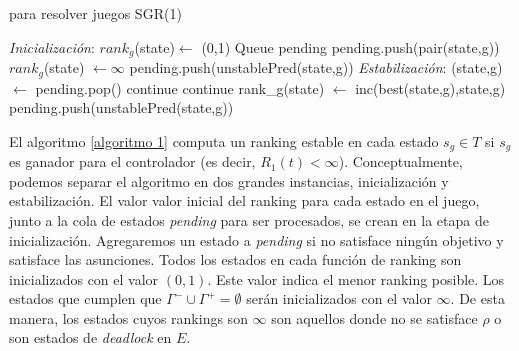 \begin{algorithm}
\caption{para resolver juegos SGR(1)}\label{euclid}
\label{algoritmo 1}
\begin{algorithmic}[1]
\BState \emph{Inicialización}:
        \State $rank_g$(state)$\gets$ (0,1)
    \EndFor
\EndFor
\State Queue pending
        \State pending.push(pair(state,g))
    \EndIf
            \State $rank_g$(state) $\gets \infty$
            \State pending.push(unstablePred(state,g))
        \EndFor
    \EndIf
\EndFor
\BState \emph{Estabilización}:
    \State (state,g) $\gets$ pending.pop()
        \State continue
    \EndIf
        \State continue
    \EndIf
    \State rank_g(state) $\gets$ inc(best(state,g),state,g)
    \State pending.push(unstablePred(state,g))
\EndWhile
\end{algorithmic}
\end{algorithm}


El algoritmo \ref{algoritmo 1} computa un ranking estable en cada estado $s_g \in T$ si $s_g$ es ganador para el
controlador (es decir, $R_1(t)<\infty$). Conceptualmente, podemos separar el algoritmo en dos grandes instancias,
inicialización y estabilización. El valor valor inicial del ranking para cada estado en el juego, junto a la cola de
estados \emph{pending} para ser procesados, se crean en la etapa de inicialización. Agregaremos un estado a
\emph{pending} si no satisface ningún objetivo y satisface las asunciones. Todos los estados en cada función de ranking
son inicializados con el valor $(0,1)$. Este valor indica el menor ranking posible. Los estados que cumplen que
$\Gamma^- \cup \Gamma^+ = \emptyset$ serán inicializados con el valor $\infty$. De esta manera, los estados cuyos
rankings son $\infty$ son aquellos donde no se satisface $\rho$ o son estados de \emph{deadlock} en $E$.
